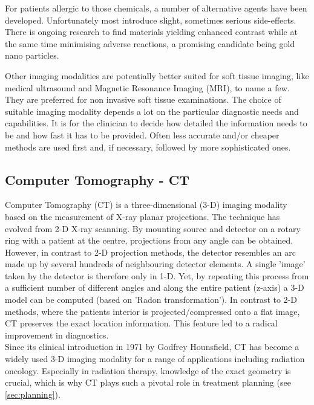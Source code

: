 For patients allergic to those chemicals, a number of alternative agents have been developed.
Unfortunately most introduce slight, sometimes serious side-effects.
There is ongoing research to find materials yielding enhanced contrast while at the same time minimising adverse reactions, a promising candidate being gold nano particles. \cite{Podgorsak, Maidment2014}


Other imaging modalities are potentially better suited for soft tissue imaging, like medical ultrasound and Magnetic Resonance Imaging (MRI), to name a few.
They are preferred for non invasive soft tissue examinations.
The choice of suitable imaging modality depends a lot on the particular diagnostic needs and capabilities.
It is for the clinician to decide how detailed the information needs to be and how fast it has to be provided.
Often less accurate and/or cheaper methods are used first and, if necessary, followed by more sophisticated ones.


\subsection{Computer Tomography - CT}

Computer Tomography (CT) is a three-dimensional (3-D) imaging modality based on the measurement of X-ray planar projections.
The technique has evolved from 2-D X-ray scanning.
By mounting source and detector on a rotary ring with a patient at the centre, projections from any angle can be obtained.
However, in contrast to 2-D projection methods, the detector resembles an arc made up by several hundreds of neighbouring detector elements.
A single 'image' taken by the detector is therefore only in 1-D.
Yet, by repeating this process from a sufficient number of different angles and along the entire patient (z-axis) a 3-D model can be computed (based on 'Radon transformation').
In contrast to 2-D methods, where the patients interior is projected/compressed onto a flat image, CT preserves the exact location information. This feature led to a radical improvement in diagnostics.	 \\

Since its clinical introduction in 1971 by Godfrey Hounsfield, CT has become a widely used 3-D imaging modality for a range of applications including radiation oncology. Especially in radiation therapy, knowledge of the exact geometry is crucial, which is why CT plays such a pivotal role in treatment planning (see \ref{sec:planning}). \cite{Podgorsak, Maidment2014}

